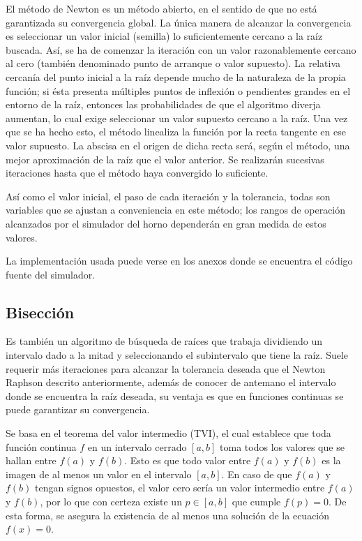 \par El método de Newton es un método abierto, en el sentido de que no está garantizada su convergencia global. La única manera de alcanzar la convergencia es seleccionar un valor inicial (semilla) lo suficientemente cercano a la raíz buscada. Así, se ha de comenzar la iteración con un valor razonablemente cercano al cero (también denominado punto de arranque o valor supuesto). La relativa cercanía del punto inicial a la raíz depende mucho de la naturaleza de la propia función; si ésta presenta múltiples puntos de inflexión o pendientes grandes en el entorno de la raíz, entonces las probabilidades de que el algoritmo diverja aumentan, lo cual exige seleccionar un valor supuesto cercano a la raíz. Una vez que se ha hecho esto, el método linealiza la función por la recta tangente en ese valor supuesto. La abscisa en el origen de dicha recta será, según el método, una mejor aproximación de la raíz que el valor anterior. Se realizarán sucesivas iteraciones hasta que el método haya convergido lo suficiente. 

\par Así como el valor inicial, el paso de cada iteración y la tolerancia, todas son variables que se ajustan a conveniencia en este método; los rangos de operación alcanzados por el simulador del horno dependerán en gran medida de estos valores.

\par La implementación usada puede verse en los anexos donde se encuentra el código fuente del simulador.

\subsection{Bisección}

\par Es también un algoritmo de búsqueda de raíces que trabaja dividiendo un intervalo dado a la mitad y seleccionando el subintervalo que tiene la raíz. Suele requerir más iteraciones para alcanzar la tolerancia deseada que el Newton Raphson descrito anteriormente, además de conocer de antemano el intervalo donde se encuentra la raíz deseada, su ventaja es que en funciones continuas se puede garantizar su convergencia.
\par Se basa en el teorema del valor intermedio (TVI), el cual establece que toda función continua $f$ en un intervalo cerrado $[a,b]$ toma todos los valores que se hallan entre $f(a)$ y $f(b)$. 
Esto es que todo valor entre $f(a)$ y $f(b)$ es la imagen de al menos un valor en el intervalo $[a,b]$. En caso de que $f(a)$ y $f(b)$ tengan signos opuestos, el valor cero sería un valor intermedio entre $f(a)$ y $f(b)$, por lo que con certeza existe un  $p\in [a,b]$ que cumple  $f(p)=0$. 
De esta forma, se asegura la existencia de al menos una solución de la ecuación $f(x)=0$.

